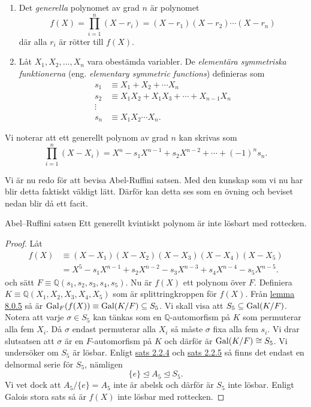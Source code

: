 \documentclass{article}
\newcommand{\gal}[0]{\textnormal{Gal}}
\theoremstyle{definition}
\begin{document}
\begin{mydef}{}{}
  \begin{enumerate}
    \item Det \textit{generella} polynomet av grad $n$ är polynomet 
    \[f(X) = \prod_{i = 1}^n (X - r_i) = (X - r_1) (X - r_2) \cdots (X - r_n)\]
    där alla $r_i$ är rötter till $f(X)$.
    \item Låt $X_1, X_2, \ldots, X_n$ vara obestämda variabler. De \textit{elementära symmetriska funktionerna} (eng. \textit{elementary symmetric functions})
    definieras som 
    \begin{align*}
      s_1 & \equiv X_1 + X_2 + \cdots X_n \\
      s_2 & \equiv X_1X_2 + X_1X_3 + \cdots + X_{n-1}X_n \\
      \vdots \\
      s_n & \equiv X_1X_2 \cdots X_n.
    \end{align*}
  \end{enumerate}
\end{mydef}

Vi noterar att ett generellt polynom av grad $n$ kan skrivas som 
\[\prod_{i = 1}^n (X - X_i) = X^n - s_1X^{n-1} + s_2 X^{n-2} + \cdots + (-1)^n s_n. \]

Vi är nu redo för att bevisa Abel-Ruffini satsen. Med den kunskap som vi nu har blir detta faktiskt väldigt lätt. Därför kan detta 
ses som en övning och beviset nedan blir då ett facit.
\begin{mytheo}{Abel–Ruffini satsen}{}
  Ett generellt kvintiskt polynom är inte lösbart med rottecken.
\end{mytheo}

\begin{proof}
  Låt 
  \begin{align*}
    f(X) & \equiv (X - X_1)(X - X_2)(X-X_3)(X - X_4) (X - X_5) \\
    &= X^5 - s_1X^{n-1} + s_2X^{n-2} - s_3X^{n-3} + s_4X^{n-4} - s_5X^{n - 5}.
  \end{align*}
  och sätt $F \equiv \mathbb{Q}(s_1, s_2, s_3, s_4, s_5)$. Nu är $f(X)$ ett polynom över $F$. 
  Definiera $K \equiv \mathbb{Q}(X_1, X_2, X_3, X_4, X_5)$ som är splittringkroppen för $f(X)$.
  Från \hyperlink{lemma9.0.5}{lemma 8.0.5} så är $\gal_F(f(X)) \equiv \gal(K/F) \subseteq S_5$. Vi skall visa att $S_5 \subseteq \gal(K/F)$.
  Notera att varje $\sigma \in S_5$ kan tänkas som en $\mathbb{Q}$-automorfism på $K$ som permuterar alla fem $X_i$. 
  Då $\sigma$ endast permuterar alla $X_i$ så måste $\sigma$ fixa alla fem $s_i$. Vi drar slutsatsen att $\sigma$ är en $F$-automorfism på $K$ och 
  därför är $\gal(K/F) \cong S_5$. Vi undersöker om $S_5$ är lösbar. Enligt \hyperlink{sats3.2.4}{sats 2.2.4} och \hyperlink{sats3.2.5}{sats 2.2.5} så 
  finns det endast en delnormal serie för $S_5$, nämligen
  \[ \{e\} \trianglelefteq A_5 \trianglelefteq S_5. \]
  Vi vet dock att $A_5/\{e\} = A_5$ inte är abelsk och därför är $S_5$ inte lösbar. Enligt Galois stora sats så är
  $f(X)$ inte lösbar med rottecken.
\end{proof}
\end{document}
